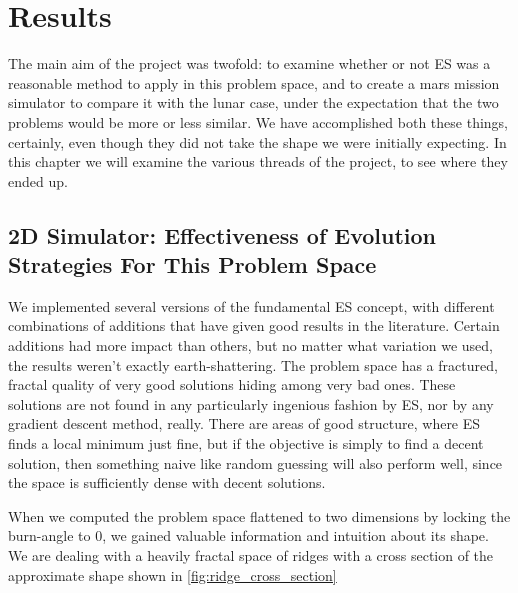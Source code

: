 
\chapter{Results}
The main aim of the project was twofold: to examine whether or not ES was a reasonable method to apply in this problem space, and to create a mars mission simulator to compare it with the lunar case, under the expectation that the two problems would be more or less similar. We have accomplished both these things, certainly, even though they did not take the shape we were initially expecting. In this chapter we will examine the various threads of the project, to see where they ended up.

\section{2D Simulator: Effectiveness of Evolution Strategies For This Problem Space}
We implemented several versions of the fundamental ES concept, with different combinations of additions that have given good results in the literature. Certain additions had more impact than others, but no matter what variation we used, the results weren't exactly earth-shattering. The problem space has a fractured, fractal quality of very good solutions hiding among very bad ones. These solutions are not found in any particularly ingenious fashion by ES, nor by any gradient descent method, really. There are areas of good structure, where ES finds a local minimum just fine, but if the objective is simply to find a decent solution, then something naive like random guessing will also perform well, since the space is sufficiently dense with decent solutions. 

When we computed the problem space flattened to two dimensions by locking the burn-angle to 0, we gained valuable information and intuition about its shape. We are dealing with a heavily fractal space of ridges with a cross section of the approximate shape shown in \cref{fig:ridge_cross_section}

